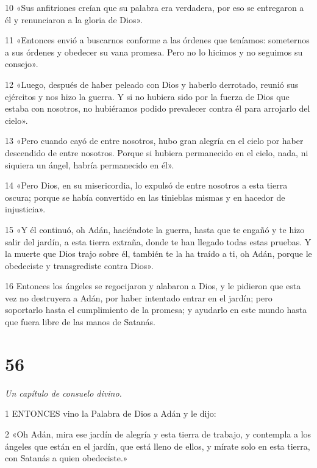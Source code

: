 \par 10 «Sus anfitriones creían que su palabra era verdadera, por eso se entregaron a él y renunciaron a la gloria de Dios».

\par 11 «Entonces envió a buscarnos conforme a las órdenes que teníamos: someternos a sus órdenes y obedecer su vana promesa. Pero no lo hicimos y no seguimos su consejo».

\par 12 «Luego, después de haber peleado con Dios y haberlo derrotado, reunió sus ejércitos y nos hizo la guerra. Y si no hubiera sido por la fuerza de Dios que estaba con nosotros, no hubiéramos podido prevalecer contra él para arrojarlo del cielo».

\par 13 «Pero cuando cayó de entre nosotros, hubo gran alegría en el cielo por haber descendido de entre nosotros. Porque si hubiera permanecido en el cielo, nada, ni siquiera un ángel, habría permanecido en él».

\par 14 «Pero Dios, en su misericordia, lo expulsó de entre nosotros a esta tierra oscura; porque se había convertido en las tinieblas mismas y en hacedor de injusticia».

\par 15 «Y él continuó, oh Adán, haciéndote la guerra, hasta que te engañó y te hizo salir del jardín, a esta tierra extraña, donde te han llegado todas estas pruebas. Y la muerte que Dios trajo sobre él, también te la ha traído a ti, oh Adán, porque le obedeciste y transgrediste contra Dios».

\par 16 Entonces los ángeles se regocijaron y alabaron a Dios, y le pidieron que esta vez no destruyera a Adán, por haber intentado entrar en el jardín; pero soportarlo hasta el cumplimiento de la promesa; y ayudarlo en este mundo hasta que fuera libre de las manos de Satanás.

\chapter{56}

\par \textit{Un capítulo de consuelo divino.}

\par 1 ENTONCES vino la Palabra de Dios a Adán y le dijo:

\par 2 «Oh Adán, mira ese jardín de alegría y esta tierra de trabajo, y contempla a los ángeles que están en el jardín, que está lleno de ellos, y mírate solo en esta tierra, con Satanás a quien obedeciste.»

